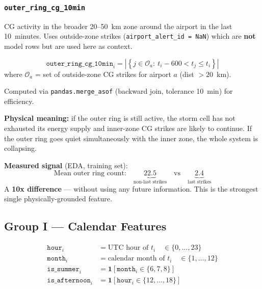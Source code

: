 \documentclass[12pt,a4paper]{article}
\newcommand{\feat}[1]{\texttt{\textbf{#1}}}
\begin{document}
\subsubsection*{\feat{outer\_ring\_cg\_10min}}

CG activity in the broader 20--50~km zone around the airport in the last 10~minutes. Uses outside-zone strikes (\texttt{airport\_alert\_id = NaN}) which are \textbf{not} model rows but are used here as context.

\begin{formulabox}
\[
  \texttt{outer\_ring\_cg\_10min}_i
  = \left|\left\{
      j \in \mathcal{O}_a :\ t_i - 600 < t_j \leq t_i
    \right\}\right|
\]
where $\mathcal{O}_a$ = set of outside-zone CG strikes for airport $a$ (dist $> 20$~km).
\end{formulabox}

Computed via \texttt{pandas.merge\_asof} (backward join, tolerance 10~min) for efficiency.

\textbf{Physical meaning:} if the outer ring is still active, the storm cell has not exhausted its energy supply and inner-zone CG strikes are likely to continue. If the outer ring goes quiet simultaneously with the inner zone, the whole system is collapsing.

\textbf{Measured signal} (EDA, training set):
\[
  \text{Mean outer ring count:} \quad
  \underbrace{22.5}_{\text{non-last strikes}}
  \quad \text{vs} \quad
  \underbrace{2.4}_{\text{last strikes}}
\]
A \textbf{10x difference} --- without using any future information. This is the strongest single physically-grounded feature.

\vspace{1em}

\subsection{Group I --- Calendar Features}

\begin{formulabox}
\begin{align}
  \texttt{hour}_i         &= \text{UTC hour of } t_i \quad \in \{0, \ldots, 23\} \\
  \texttt{month}_i        &= \text{calendar month of } t_i \quad \in \{1, \ldots, 12\} \\
  \texttt{is\_summer}_i   &= \mathbf{1}[\texttt{month}_i \in \{6, 7, 8\}] \\
  \texttt{is\_afternoon}_i &= \mathbf{1}[\texttt{hour}_i \in \{12, \ldots, 18\}]
\end{align}
\end{formulabox}
\end{document}
